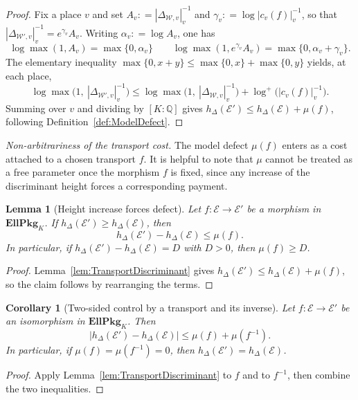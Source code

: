 \documentclass[10pt, reqno]{amsart}
\theoremstyle{plain}
\newtheorem{lemma}[theorem]{Lemma}
\newtheorem{corollary}[theorem]{Corollary}
\theoremstyle{definition}
\theoremstyle{plain}
\newcommand{\Q}{\mathbb{Q}}
\newcommand{\coloneqq}{\mathrel{\mathop:}=}
\newcommand{\parahead}[1]{%
  \par\medskip
  \noindent\textit{#1.}\enspace
}
\begin{document}
\begin{proof}
Fix a place $v$ and set $A_v \coloneqq |\Delta_{\mathcal{W},v}|_v^{-1}$ and $\gamma_v \coloneqq \log |c_v(f)|_v^{-1}$, so that $|\Delta_{\mathcal{W}',v}|_v^{-1} = e^{\gamma_v} A_v$. Writing $\alpha_v \coloneqq \log A_v$, one has
\[
\log \max(1, A_v) = \max\{0,\alpha_v\}
\qquad
\log \max(1, e^{\gamma_v}A_v) = \max\{0,\alpha_v+\gamma_v\}.
\]
The elementary inequality $\max\{0,x+y\} \le \max\{0,x\} + \max\{0,y\}$ yields, at each place,
\[
\log \max\bigl(1,\ |\Delta_{\mathcal{W}',v}|_v^{-1}\bigr)
\le
\log \max\bigl(1,\ |\Delta_{\mathcal{W},v}|_v^{-1}\bigr)
+
\log^{+}\!\bigl(|c_v(f)|_v^{-1}\bigr).
\]
Summing over $v$ and dividing by $[K:\Q]$ gives $h_\Delta(\mathcal{E}') \le h_\Delta(\mathcal{E}) + \mu(f)$, following Definition~\ref{def:ModelDefect}.
\end{proof}

\parahead{Non-arbitrariness of the transport cost} The model defect $\mu(f)$ enters as a cost attached to a chosen transport $f$. It is helpful to note that $\mu$ cannot be treated as a free parameter once the morphism $f$ is fixed, since any increase of the discriminant height forces a corresponding payment.

\begin{lemma}[Height increase forces defect]\label{lem:HeightIncreaseForcesDefect}
Let $f \colon \mathcal{E} \to \mathcal{E}'$ be a morphism in $\mathbf{EllPkg}_K$. If $h_\Delta(\mathcal{E}') \ge h_\Delta(\mathcal{E})$, then
\[
h_\Delta(\mathcal{E}') - h_\Delta(\mathcal{E}) \le \mu(f).
\]
In particular, if $h_\Delta(\mathcal{E}') - h_\Delta(\mathcal{E}) = D$ with $D>0$, then $\mu(f)\ge D$.
\end{lemma}

\begin{proof}
Lemma~\ref{lem:TransportDiscriminant} gives $h_\Delta(\mathcal{E}') \le h_\Delta(\mathcal{E}) + \mu(f)$, so the claim follows by rearranging the terms.
\end{proof}

\begin{corollary}[Two-sided control by a transport and its inverse]\label{cor:TwoSidedControlTransport}
Let $f \colon \mathcal{E}\to\mathcal{E}'$ be an isomorphism in $\mathbf{EllPkg}_K$. Then
\[
\bigl|h_\Delta(\mathcal{E}') - h_\Delta(\mathcal{E})\bigr|
\le
\mu(f) + \mu(f^{-1}).
\]
In particular, if $\mu(f)=\mu(f^{-1})=0$, then $h_\Delta(\mathcal{E}') = h_\Delta(\mathcal{E})$.
\end{corollary}

\begin{proof}
Apply Lemma~\ref{lem:TransportDiscriminant} to $f$ and to $f^{-1}$, then combine the two inequalities.
\end{proof}
\end{document}
